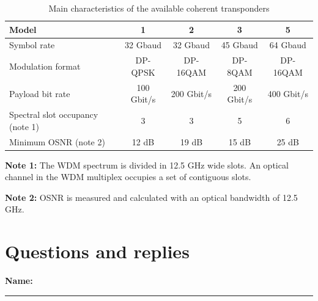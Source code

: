 \documentclass[a4paper,11pt]{article}
\begin{document}
\begin{table}[h]
\centering
\begin{tabular}{lcccc}
\toprule
\textbf{Model} & \textbf{1} & \textbf{2} & \textbf{3} & \textbf{5} \\
\midrule
Symbol rate & 32 Gbaud & 32 Gbaud & 45 Gbaud & 64 Gbaud \\
Modulation format & DP-QPSK & DP-16QAM & DP-8QAM & DP-16QAM \\
Payload bit rate & 100 Gbit/s & 200 Gbit/s & 200 Gbit/s & 400 Gbit/s \\
Spectral slot occupancy (note 1) & 3 & 3 & 5 & 6 \\
Minimum OSNR (note 2) & 12 dB & 19 dB & 15 dB & 25 dB \\
\bottomrule
\end{tabular}
\caption{Main characteristics of the available coherent transponders}
\end{table}

\textbf{Note 1:} The WDM spectrum is divided in 12.5 GHz wide slots. An optical channel in the WDM multiplex occupies a set of contiguous slots.

\textbf{Note 2:} OSNR is measured and calculated with an optical bandwidth of 12.5 GHz.

\section*{Questions and replies}

\textbf{Name:} \rule{8cm}{0.4pt}
\end{document}

